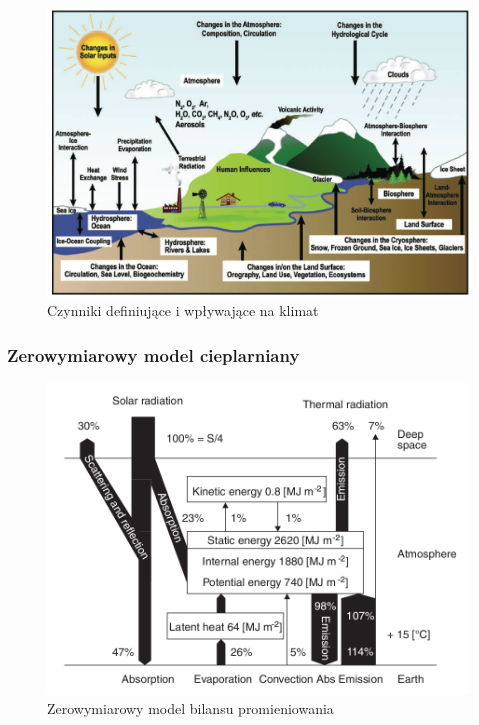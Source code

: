 \documentclass{beamer}
\begin{document}
\begin{frame}
	\frametitle{}
	\begin{figure}[h]
		\begin{center}
			\includegraphics[width=0.7\linewidth]{images/Figure1}
			\caption{Czynniki definiujące i wpływające na klimat}
		\end{center}
	\end{figure}
\end{frame}

\begin{frame}
	\frametitle{Zerowymiarowy model cieplarniany}
	\begin{figure}[h]
		\begin{center}
			\includegraphics[width=0.7\linewidth]{images/0D_Model.png}
			\caption{Zerowymiarowy model bilansu promieniowania}
		\end{center}
	\end{figure}

\end{frame}
\end{document}
